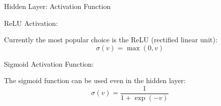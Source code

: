 \begin{vbframe}{Hidden Layer: Activation Function}
\begin{blocki}{ReLU Activation:}
\item Currently the most popular choice is the ReLU (rectified linear unit):
$$ \sigma (v) = \max(0,v) $$
\end{blocki}
\begin{figure}
\end{figure}
\framebreak


\begin{blocki}{Sigmoid Activation Function:}
\item The sigmoid function can be used even in the hidden layer:
$$ \sigma(v) = \frac{1}{1+\exp (-v)} $$
\end{blocki}
\begin{figure}
\end{figure}
\end{vbframe}







\endlecture
